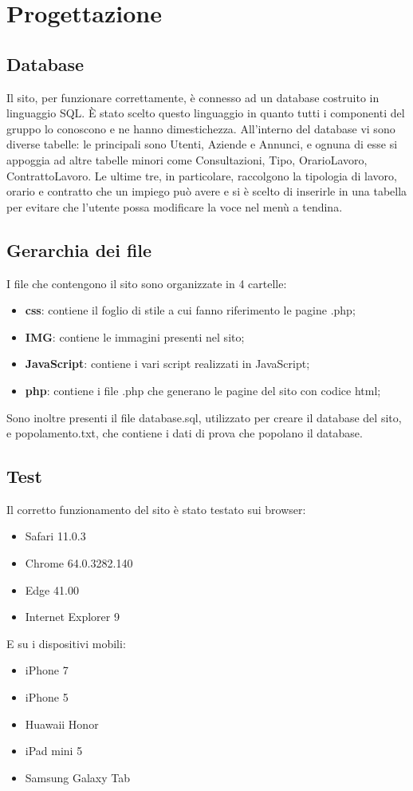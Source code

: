 \section{Progettazione}
	\subsection{Database}
Il sito, per funzionare correttamente, è connesso ad un database costruito in linguaggio SQL. È stato scelto questo linguaggio in quanto tutti i componenti del gruppo lo conoscono e ne hanno dimestichezza. 
All'interno del database vi sono diverse tabelle: le principali sono Utenti, Aziende e Annunci, e ognuna di esse si appoggia ad altre tabelle minori come Consultazioni, Tipo, OrarioLavoro, ContrattoLavoro. Le ultime tre, in particolare, raccolgono la tipologia di lavoro, orario e contratto che un impiego può avere e si è scelto di inserirle in una tabella per evitare che l'utente possa modificare la voce nel menù a tendina.   

\subsection{Gerarchia dei file}
I file che contengono il sito sono organizzate in 4 cartelle: 
\begin{itemize}
	\item \textbf{css}: contiene il foglio di stile a cui fanno riferimento le pagine .php;
	\item \textbf{IMG}: contiene le immagini presenti nel sito;
	\item \textbf{JavaScript}: contiene i vari script realizzati in JavaScript;
	\item \textbf{php}: contiene i file .php che generano le pagine del sito con codice html;
\end{itemize}
Sono inoltre presenti il file database.sql, utilizzato per creare il database del sito, e popolamento.txt, che contiene i dati di prova che popolano il database.


\subsection{Test}
Il corretto funzionamento del sito è stato testato sui browser:
\begin{itemize}
	\item Safari 11.0.3
	\item Chrome 64.0.3282.140
	\item Edge 	41.00
	\item Internet Explorer 9
\end{itemize}
E su i dispositivi mobili:
\begin{itemize}
	\item iPhone 7
	\item iPhone 5
	\item Huawaii Honor
	\item iPad mini 5
	\item Samsung Galaxy Tab
\end{itemize}